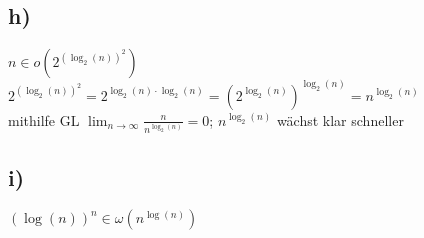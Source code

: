 \subsection*{h)}
$ n\in o(2 ^{ (\log_2(n))^2 } ) $\\
$ 2 ^{ (\log_2(n))^2 } = 2 ^{ \log_2(n)\cdot\log_2(n) } = (2 ^{ \log_2(n) })^{\log_2(n)} = n ^{ \log_2(n) } $ \\
mithilfe GL $ \lim _{ n \rightarrow \infty } \frac{ n }{ n ^{ \log_2(n) }  } = 0$; $ n ^{ \log_2(n) } $ wächst klar schneller 
\subsection*{i)}
$ (\log(n))^n\in\omega(n^{\log(n)}) $